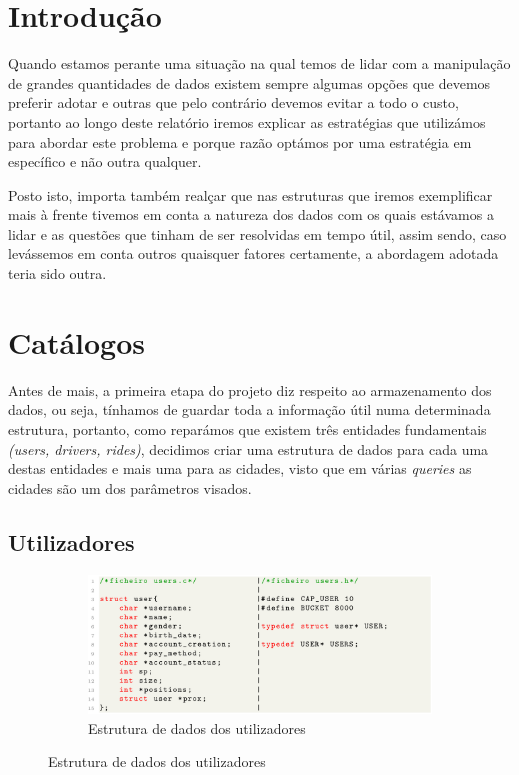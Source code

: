 \documentclass[12pt,a4paper]{report}
\begin{document}
\chapter{Introdução}

Quando estamos perante uma situação na qual temos de lidar com a manipulação de grandes quantidades de dados existem sempre algumas opções que devemos preferir adotar e outras que pelo contrário devemos evitar a todo o custo, portanto ao longo deste relatório iremos explicar as estratégias que utilizámos para abordar este problema e porque razão optámos por uma estratégia em específico e não outra qualquer.

Posto isto, importa também realçar que nas estruturas que iremos exemplificar mais à frente tivemos em conta a natureza dos dados com os quais estávamos a lidar e as questões que tinham de ser resolvidas em tempo útil, assim sendo, caso levássemos em conta outros quaisquer fatores certamente, a abordagem adotada teria sido outra.

\chapter{Catálogos}

Antes de mais, a primeira etapa do projeto diz respeito ao armazenamento dos dados, ou seja, tínhamos de guardar toda a informação útil numa determinada estrutura, portanto, como reparámos que existem três entidades fundamentais \textit{(users, drivers, rides)}, decidimos criar uma estrutura de dados para cada uma destas entidades e mais uma para as cidades, visto que em várias \textit{queries} as cidades são um dos parâmetros visados.

\section{Utilizadores}

\begin{figure}[h]
    \centering
    \begin{subfigure}{\textwidth}
        \centering
        \includegraphics[width=1\linewidth]{images/users.png}
        \caption*{Estrutura de dados dos utilizadores}
        \label{fig:users}
    \end{subfigure}
\end{figure}
\end{document}
